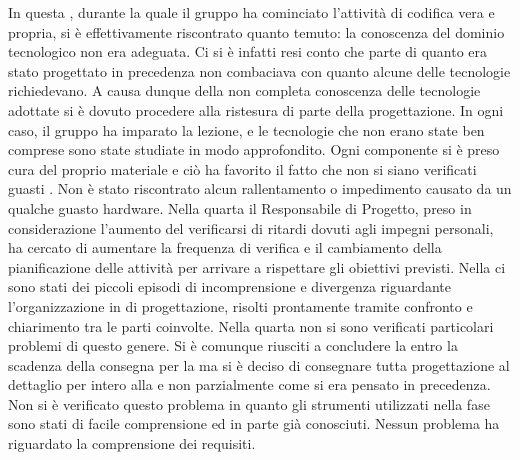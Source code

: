 		In questa , durante la quale il gruppo ha cominciato l'attività di codifica vera e propria, si è effettivamente riscontrato quanto temuto: la conoscenza del dominio tecnologico non era adeguata. Ci si è infatti resi conto che parte di quanto era stato progettato in precedenza non combaciava con quanto alcune delle tecnologie richiedevano. A causa dunque della non completa conoscenza delle tecnologie adottate si è dovuto procedere alla ristesura di parte della progettazione. In ogni caso, il gruppo ha imparato la lezione, e le tecnologie che non erano state ben comprese sono state studiate in modo approfondito.
		Ogni componente si è preso cura del proprio materiale e ciò ha favorito il fatto che non si siano verificati guasti . Non è stato riscontrato alcun rallentamento o impedimento causato da un qualche guasto hardware.
		Nella quarta  il Responsabile di Progetto, preso in considerazione l’aumento del verificarsi di ritardi dovuti agli impegni personali, ha cercato di aumentare la frequenza di verifica e il cambiamento della pianificazione delle attività per arrivare a rispettare gli obiettivi previsti.
		Nella  ci sono stati dei piccoli episodi di incomprensione e divergenza riguardante l’organizzazione in  di progettazione, risolti prontamente tramite confronto e chiarimento tra le parti coinvolte.
		Nella quarta  non si sono verificati particolari problemi di questo genere. Si è comunque riusciti a concludere la  entro la scadenza della consegna per la  ma si è deciso di consegnare tutta progettazione al dettaglio per intero alla  e non parzialmente come si era pensato in precedenza.
		Non si è verificato questo problema in quanto gli strumenti utilizzati nella fase sono stati di facile comprensione ed in parte già conosciuti.
		Nessun problema ha riguardato la comprensione dei requisiti.

